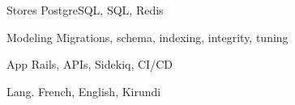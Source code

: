 
\begin{cvskills}

  \cvskill
    {Stores}
    {PostgreSQL, SQL, Redis}

  \cvskill
    {Modeling}
    {Migrations, schema, indexing, integrity, tuning}

  \cvskill
    {App}
    {Rails, APIs, Sidekiq, CI/CD}

  \cvskill
    {Lang.}
    {French, English, Kirundi}

\end{cvskills}

